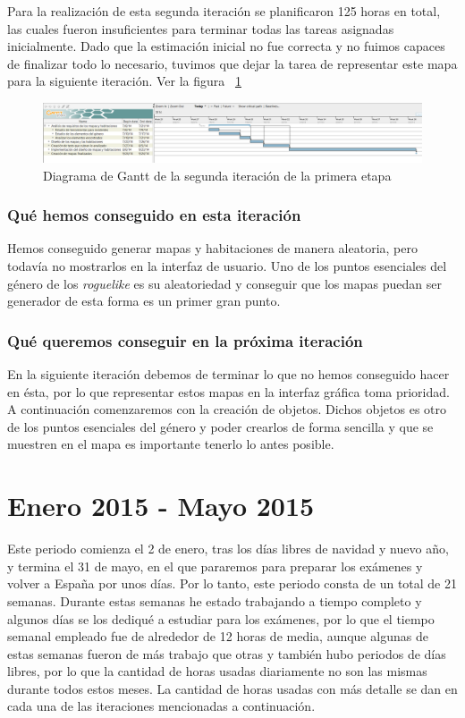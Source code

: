Para la realización de esta segunda iteración se planificaron 125 horas en total, las cuales fueron insuficientes para terminar todas las tareas asignadas inicialmente. Dado que la estimación inicial no fue correcta y no fuimos capaces de finalizar todo lo necesario, tuvimos que dejar la tarea de representar este mapa para la siguiente iteración. Ver la figura ~\ref{fig:sec1it2}

\begin{figure}
    \includegraphics[width=\textwidth,height=\textheight,keepaspectratio]{./img/sec1it2.png}
  \caption{Diagrama de Gantt de la segunda iteración de la primera etapa}
  \label{fig:sec1it2}
\end{figure}

\subsubsection{Qué hemos conseguido en esta iteración}

Hemos conseguido generar mapas y habitaciones de manera aleatoria, pero todavía no mostrarlos en la interfaz de usuario. Uno de los puntos esenciales del género de los \textit{roguelike} es su aleatoriedad y conseguir que los mapas puedan ser generador de esta forma es un primer gran punto.

\subsubsection{Qué queremos conseguir en la próxima iteración}

En la siguiente iteración debemos de terminar lo que no hemos conseguido hacer en ésta, por lo que representar estos mapas en la interfaz gráfica toma prioridad. A continuación comenzaremos con la creación de objetos. Dichos objetos es otro de los puntos esenciales del género y poder crearlos de forma sencilla y que se muestren en el mapa es importante tenerlo lo antes posible.

\section{Enero 2015 - Mayo 2015}

Este periodo comienza el 2 de enero, tras los días libres de navidad y nuevo año, y termina el 31 de mayo, en el que pararemos para preparar los exámenes y volver a España por unos días. Por lo tanto, este periodo consta de un total de 21 semanas. Durante estas semanas he estado trabajando a tiempo completo y algunos días se los dediqué a estudiar para los exámenes, por lo que el tiempo semanal empleado fue de alrededor de 12 horas de media, aunque algunas de estas semanas fueron de más trabajo que otras y también hubo periodos de días libres, por lo que la cantidad de horas usadas diariamente no son las mismas durante todos estos meses. La cantidad de horas usadas con más detalle se dan en cada una de las iteraciones mencionadas a continuación.

